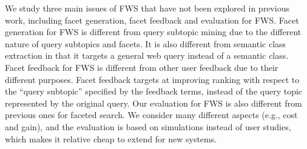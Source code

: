We study three main issues of FWS that have not been explored in previous work, including facet generation, facet feedback and evaluation for FWS. Facet generation for FWS is different from query subtopic mining due to the different nature of query subtopics and facets. It is also different from semantic class extraction in that it targets a general web query instead of a semantic class. Facet feedback for FWS is different from other user feedback due to their different purposes. Facet feedback targets at improving ranking with respect to the ``query subtopic'' specified by the feedback terms, instead of the query topic represented by the original query. Our evaluation for FWS is also different from previous ones for faceted search. We consider many different aspects (e.g., cost and gain), and the evaluation is based on simulations instead of user studies, which makes it relative cheap to extend for new systems. 
